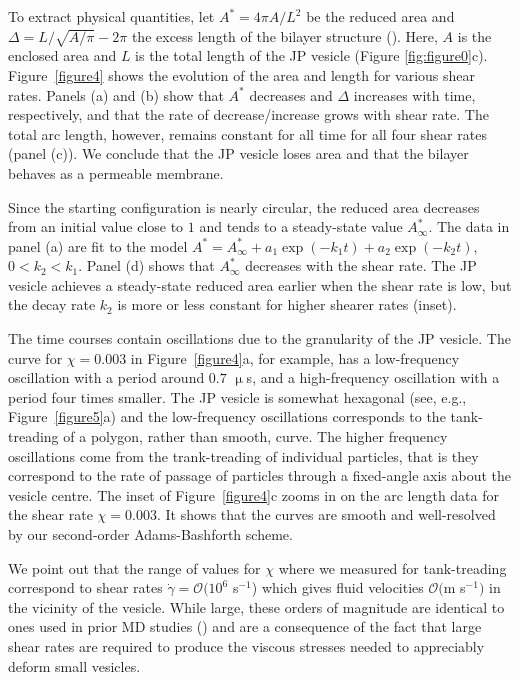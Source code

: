\documentclass[lineno]{jfm}
\begin{document}
To extract physical quantities, let $A^* = 4\pi A/L^2$ be the reduced
area and $\Delta=L/\sqrt{A/\pi} - 2\pi$ the excess length of the bilayer
structure (\cite{Finken08}). Here, $A$ is the enclosed area and $L$ is
the total length of the JP vesicle (Figure \ref{fig:figure0}c).
Figure~\ref{figure4} shows the evolution of the area and length for
various shear rates. Panels (a) and (b) show that $A^*$ decreases and
$\Delta$ increases with time, respectively, and that the rate of
decrease/increase grows with shear rate. The total arc length, however,
remains constant for all time for all four shear rates (panel (c)). We
conclude that the JP vesicle loses area and that the bilayer behaves as
a permeable membrane. 

Since the starting configuration is nearly circular, the reduced area
decreases from an initial value close to $1$ and tends to a steady-state
value $A^*_{\infty}$. The data in panel (a) are fit to the model $A^* =
A^*_{\infty} + a_1 \exp(-k_1t) + a_2 \exp(-k_2t),$ $0 < k_2 <
k_1$. Panel (d) shows that $A^*_{\infty}$ decreases with the shear rate.
The JP vesicle achieves a steady-state reduced area earlier when the
shear rate is low, but the decay rate $k_2$ is more or less
constant for higher shearer rates (inset). 

The time courses contain oscillations due to the
granularity of the JP vesicle.
The curve for $\chi = 0.003$ in Figure~\ref{figure4}a, for example, 
has a low-frequency oscillation with a period around $0.7$ $\upmu$s,
and a high-frequency oscillation with a period four times smaller.
The JP vesicle is somewhat hexagonal (see, e.g., Figure~\ref{figure5}a)
and the low-frequency oscillations corresponds to the tank-treading of a 
polygon, rather than smooth, curve. The higher frequency oscillations
come from the trank-treading of individual particles, that is
they correspond to the rate of passage of particles through a fixed-angle
axis about the vesicle centre.
The inset of Figure~\ref{figure4}c zooms
in on the arc length data for the shear rate $\chi = 0.003$. It shows
that the curves are smooth and well-resolved by our second-order
Adams-Bashforth scheme.

We point out that the range of values for $\chi$ where we measured for
tank-treading correspond to shear rates $\dot \gamma = \mathcal{O}(10^6$
s$^{-1}$) which gives fluid velocities $\mathcal{O}($m s$^{-1}$$)$ in
the vicinity of the vesicle. While large, these orders of magnitude are identical to
ones used in prior MD studies (\cite{Brandner2019}) and are a
consequence of the fact that large shear rates are required to produce
the viscous stresses needed to appreciably deform small vesicles. 
\end{document}
